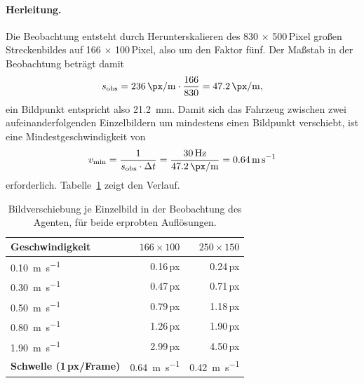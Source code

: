 \paragraph{Herleitung.}
Die Beobachtung entsteht durch Herunterskalieren des \num{830} $\times$ \num{500}\,Pixel großen Streckenbildes auf \num{166} $\times$ \num{100}\,Pixel, also um den Faktor fünf. Der Maßstab in der Beobachtung beträgt damit
\begin{equation}
  s_{\text{obs}} = \SI{236}{\px\per\meter} \cdot \frac{166}{830} = \SI{47.2}{\px\per\meter},
  \label{eq:massstab_obs}
\end{equation}
ein Bildpunkt entspricht also \SI{21.2}{\milli\meter}. Damit sich das Fahrzeug zwischen zwei aufeinanderfolgenden Einzelbildern um mindestens einen Bildpunkt verschiebt, ist eine Mindestgeschwindigkeit von
\begin{equation}
  v_{\min} = \frac{1}{s_{\text{obs}} \cdot \Delta t} = \frac{\SI{30}{\hertz}}{\SI{47.2}{\px\per\meter}} = \SI{0.64}{\meter\per\second}
  \label{eq:schwelle}
\end{equation}
erforderlich. Tabelle~\ref{tab:subpixel} zeigt den Verlauf.

\begin{table}[htbp]
  \centering
  \caption{Bildverschiebung je Einzelbild in der Beobachtung des Agenten, für beide erprobten Auflösungen.}
  \label{tab:subpixel}
  \begin{tabular}{@{}l r r@{}}
    \toprule
    \textbf{Geschwindigkeit} & \textbf{$166\times100$} & \textbf{$250\times150$} \\
    \midrule
    \SI{0.10}{\meter\per\second} & \num{0.16}\,px & \num{0.24}\,px \\
    \SI{0.30}{\meter\per\second} & \num{0.47}\,px & \num{0.71}\,px \\
    \SI{0.50}{\meter\per\second} & \num{0.79}\,px & \num{1.18}\,px \\
    \SI{0.80}{\meter\per\second} & \num{1.26}\,px & \num{1.90}\,px \\
    \SI{1.90}{\meter\per\second} & \num{2.99}\,px & \num{4.50}\,px \\
    \midrule
    \textbf{Schwelle (1\,px/Frame)} & \SI{0.64}{\meter\per\second} & \SI{0.42}{\meter\per\second} \\
    \bottomrule
  \end{tabular}
\end{table}

